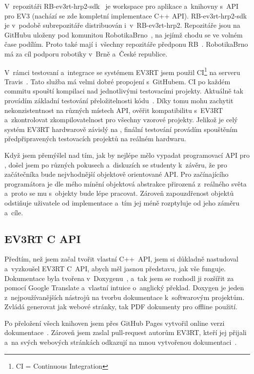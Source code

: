 V~repozitáři RB-ev3rt-hrp2-sdk~\cite{RB-ev3rt-hrp2-sdk-github} je workspace pro aplikace a~knihovny s~API pro EV3 (nachází se zde kompletní implementace C++ API). RB-ev3rt-hrp2-sdk je v~podobě subrepozitáře distribuován i~v~RB-ev3rt-hrp2. Repozitáře jsou na GitHubu uloženy pod komunitou RobotikaBrno~\cite{RobotikaBrno-web}, na jejímž chodu se ve volném čase podílím. Proto také mají i~všechny repozitáře předponu RB~\cite{RoboticsBrno-github}. RobotikaBrno má za cíl podporu robotiky v~Brně a~České republice.

V~rámci testovaní a~integrace se systémem EV3RT jsem použil CI\footnote{CI = Continuous Integration} na serveru Travis~\cite{Travis-web}.
Tato služba má velmi dobré propojení s~GitHubem. 
CI po každém commitu spouští kompilaci nad jednotlivými testovacími projekty.
Aktuálně tak provádím základní testování přeložitelnosti kódu~\cite{Travis-RB-ev3rt-hrp2-sdk}.
Díky tomu mohu zachytit nekonzistentnost na různých místech API, ověřit kompatibilitu s~EV3RT a~zkontrolovat zkompilovatelnost pro všechny vzorové projekty.  
Jelikož je celý systém EV3RT hardwarově závislý na \legoEV{}, finální testování provádím spouštěním předpřipravených testovacích projektů na reálném hardwaru.

Když jsem přemýšlel nad tím, jak by nejlépe mělo vypadat programovací API pro \lego{}, došel jsem po různých pokusech a~diskuzích se studenty k~závěru, že pro začátečníka bude nejvhodnější objektově orientované API.
Pro začínajícího programátora je dle mého mínění objektová abstrakce přirozená z~reálného světa a~proto se mu s~objekty bude lépe pracovat.
Zároveň zapouzdřenost objektů odstiňuje uživatele od implementace a~tím jej méně rozptyluje od jeho záměru a~cíle.

\subsection{EV3RT C API}


Předtím, než jsem začal tvořit vlastní C++~API, jsem si důkladně nastudoval a~vyzkoušel EV3RT C~API, abych měl jasnou představu, jak vše funguje.
Dokumentace byla tvořena v~Doxygenu~\cite{doxygen-web}, a~tak jsem se rozhodl ji rozšířit za pomocí Google Translate a~vlastní intuice o~anglický překlad.
Doxygen je jeden z~nejpoužívanějších nástrojů na tvorbu dokumentace k~softwarovým projektům. 
Zvládá generovat jak webové stránky, tak PDF dokumenty pro offline použití.

Po přeložení všech knihoven jsem přes GitHub Pages vytvořil online verzi dokumentace~\cite{roboticsbrno-EV3RT-API-Reference}.
Zároveň jsem zaslal pull-request autorům EV3RT, kteří jej přijali a~na svých webových stránkách odkazují na mnou vytvořenou dokumentaci~\cite{EV3RT-git-web_documentation}.

